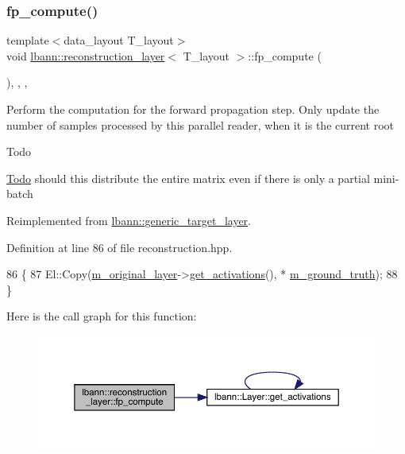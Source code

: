 \subsubsection{\texorpdfstring{fp\+\_\+compute()}{fp\_compute()}}
{\footnotesize\ttfamily template$<$data\+\_\+layout T\+\_\+layout$>$ \\
void \hyperlink{classlbann_1_1reconstruction__layer}{lbann\+::reconstruction\+\_\+layer}$<$ T\+\_\+layout $>$\+::fp\+\_\+compute (\begin{DoxyParamCaption}{ }\end{DoxyParamCaption})\hspace{0.3cm}{\ttfamily [inline]}, {\ttfamily [override]}, {\ttfamily [protected]}, {\ttfamily [virtual]}}

Perform the computation for the forward propagation step. Only update the number of samples processed by this parallel reader, when it is the current root

\begin{DoxyRefDesc}{Todo}
\item[\hyperlink{todo__todo000023}{Todo}]should this distribute the entire matrix even if there is only a partial mini-\/batch \end{DoxyRefDesc}


Reimplemented from \hyperlink{classlbann_1_1generic__target__layer_a57a60f5a28c9fb78d5151801123d4dba}{lbann\+::generic\+\_\+target\+\_\+layer}.



Definition at line 86 of file reconstruction.\+hpp.


\begin{DoxyCode}
86                              \{
87     El::Copy(\hyperlink{classlbann_1_1reconstruction__layer_a077a29792de2a39015da8b18120a00e3}{m\_original\_layer}->\hyperlink{classlbann_1_1Layer_a1134b1a4385af199d7272c5aa827fa99}{get\_activations}(), *
      \hyperlink{classlbann_1_1generic__target__layer_acb9ba351caf22b8e2378e4cd1e256da7}{m\_ground\_truth});
88   \}
\end{DoxyCode}
Here is the call graph for this function\+:\nopagebreak
\begin{figure}[H]
\begin{center}
\leavevmode
\includegraphics[width=350pt]{classlbann_1_1reconstruction__layer_ad33ec2cccf89b317e22ec73b1761e427_cgraph}
\end{center}
\end{figure}
\mbox{\label{classlbann_1_1reconstruction__layer_a7516698ae3de4cea311ec17685a0b60a}} 
